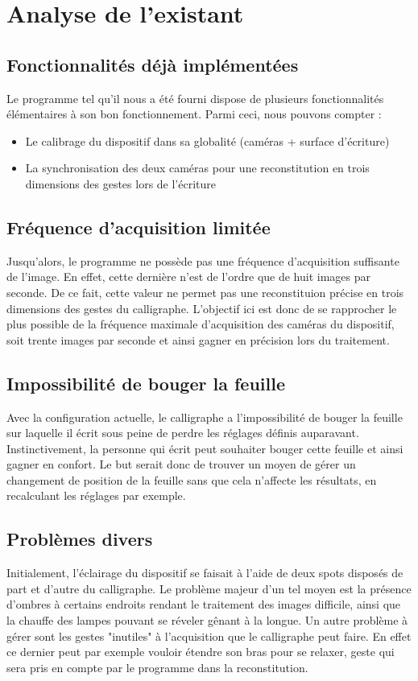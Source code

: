 \section{Analyse de l'existant}

\subsection{Fonctionnalités déjà implémentées}

Le programme tel qu'il nous a été fourni dispose de plusieurs fonctionnalités élémentaires à son bon fonctionnement. Parmi ceci, nous pouvons compter :
\begin{itemize}
\item Le calibrage du dispositif dans sa globalité (caméras + surface d'écriture)
\item La synchronisation des deux caméras pour une reconstitution en trois dimensions des gestes lors de l'écriture
\end{itemize}

\subsection{Fréquence d'acquisition limitée}

Jusqu'alors, le programme ne possède pas une fréquence d'acquisition suffisante de l'image. En effet, cette dernière n'est de l'ordre que de huit images par seconde. De ce fait, cette valeur ne permet pas une reconstituion précise en trois dimensions des gestes du calligraphe. L'objectif ici est donc de se rapprocher le plus possible de la fréquence maximale d'acquisition des caméras du dispositif, soit trente images par seconde et ainsi gagner en précision lors du traitement.

\subsection{Impossibilité de bouger la feuille}

Avec la configuration actuelle, le calligraphe a l'impossibilité de bouger la feuille sur laquelle il écrit sous peine de perdre les réglages définis auparavant. Instinctivement, la personne qui écrit peut souhaiter bouger cette feuille et ainsi gagner en confort. Le but serait donc de trouver un moyen de gérer un changement de position de la feuille sans que cela n'affecte les résultats, en recalculant les réglages par exemple.

\subsection{Problèmes divers}

Initialement, l'éclairage du dispositif se faisait à l'aide de deux spots disposés de part et d'autre du calligraphe. Le problème majeur d'un tel moyen est la présence d'ombres à certains endroits rendant le traitement des images difficile, ainsi que la chauffe des lampes pouvant se réveler gênant à la longue. Un autre problème à gérer sont les gestes "inutiles" à l'acquisition que le calligraphe peut faire. En effet ce dernier peut par exemple vouloir étendre son bras pour se relaxer, geste qui sera pris en compte par le programme dans la reconstitution.